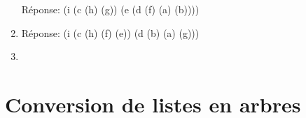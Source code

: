 \documentclass[a4paper, 11pt]{article}
\begin{document}
\begin{enumerate}
Réponse: (i (c (h) (g)) (e (d (f) (a) (b))))
  \item {}
Réponse: (i (c (h) (f) (e)) (d (b) (a) (g)))
  \item {}
\end{enumerate}

\section{Conversion de listes en arbres}
\end{document}

